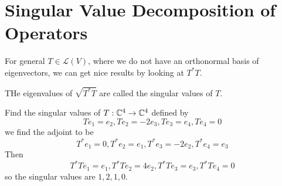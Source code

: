\documentclass[12pt]{article}
\begin{document}
\section{Singular Value Decomposition of Operators}

For general $T \in \mathcal L(V)$, where we do not have an orthonormal basis of eigenvectors, we can get nice results by looking at $T^*T$.

\begin{defn}
	THe eigenvalues of $\sqrt{T^*T}$ are called the singular values of $T$.
\end{defn}

\begin{ex}
	Find the singular values of $T:\mathbb{C}^4 \rightarrow \mathbb{C}^4$ defined by
	$$Te_1 = e_2, Te_2 = -2e_3, Te_3 = e_4, Te_4 = 0$$
	we find the adjoint to be
	$$T^*e_1 = 0, T^*e_2 = e_1, T^*e_3 = -2e_2, T^*e_4 = e_3$$
	Then
	$$T^*Te_1 = e_1, T^*Te_2 = 4e_2, T^*Te_3 = e_3, T^*Te_4 = 0$$
	so the singular values are $1,2,1,0$.
\end{ex}
\end{document}
